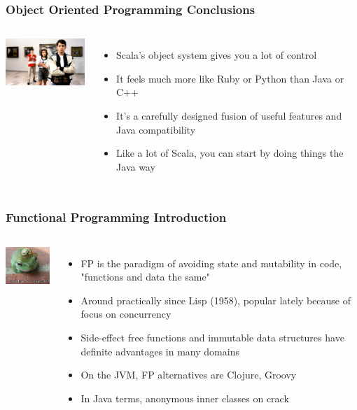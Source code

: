 \documentclass[hyperref={colorlinks=true}]{beamer}
\begin{document}
\begin{frame} 
\frametitle{Object Oriented Programming Conclusions}
\begin{columns}[c]
  \column{1.0in}
    \includegraphics[width=1.5in]{graphics/ferris.jpg} 
  \column{2.0in}
    \begin{itemize}
      \item<1-> Scala's object system gives you a lot of control
      \item<2-> It feels much more like Ruby or Python than Java or C++
      \item<3-> It's a carefully designed fusion of useful features and Java compatibility
      \item<4-> Like a lot of Scala, you can start by doing things the Java way
    \end{itemize}
\end{columns}
\end{frame} 

\begin{frame} 
\frametitle{Functional Programming Introduction}
\begin{columns}[c]
  \column{0.5in}
    \includegraphics[width=1.0in]{graphics/hat.png} 
  \column{2.5in}
    \begin{itemize}
      \item<1-> FP is the paradigm of avoiding state and mutability in code, "functions and data the same"
      \item<2-> Around practically since Lisp (1958), popular lately because of focus on concurrency
      \item<3-> Side-effect free functions and immutable data structures have definite advantages in many domains
      \item<4-> On the JVM, FP alternatives are Clojure, Groovy
      \item<5-> In Java terms, anonymous inner classes on crack
    \end{itemize}
\end{columns}
\end{frame} 
\end{document}
